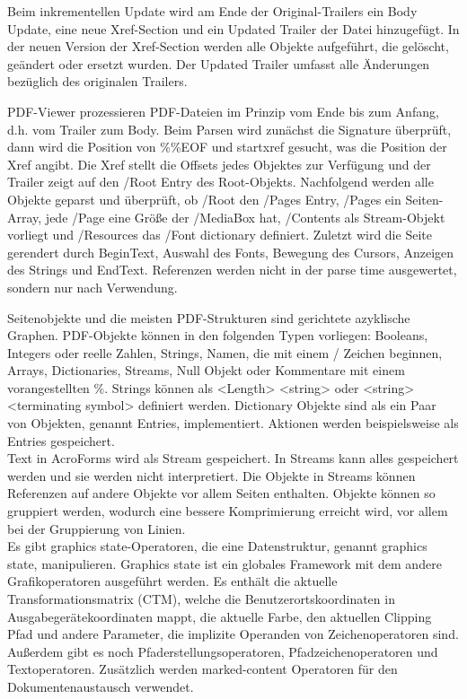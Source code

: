 \par
Beim inkrementellen Update wird am Ende der Original-Trailers ein Body Update, eine neue Xref-Section und ein Updated Trailer der Datei hinzugefügt. In der neuen Version der Xref-Section werden alle Objekte aufgeführt, die gelöscht, geändert oder ersetzt wurden. Der Updated Trailer umfasst alle Änderungen bezüglich des originalen Trailers. \cite{schneeberger}
\par
PDF-Viewer prozessieren PDF-Dateien im Prinzip vom Ende bis zum Anfang, d.h. vom Trailer zum Body. \cite{ccc-break-pdf} Beim Parsen wird zunächst die Signature überprüft, dann wird die Position von \%\%EOF und startxref gesucht, was die Position der Xref angibt. Die Xref stellt die Offsets jedes Objektes zur Verfügung und der Trailer zeigt auf den /Root Entry des Root-Objekts. Nachfolgend werden alle Objekte geparst und überprüft, ob /Root den /Pages Entry, /Pages ein Seiten-Array, jede /Page eine Größe der /MediaBox hat, /Contents als Stream-Objekt vorliegt und /Resources das /Font dictionary definiert. Zuletzt wird die Seite gerendert durch BeginText, Auswahl des Fonts, Bewegung des Cursors, Anzeigen des Strings und EndText. \cite{ccc-pdf-secrets} Referenzen werden nicht in der parse time ausgewertet, sondern nur nach Verwendung. \cite{ccc-wtf-pdf}
\par
Seitenobjekte und die meisten PDF-Strukturen sind gerichtete azyklische Graphen. \cite{ccc-wtf-pdf} PDF-Objekte können in den folgenden Typen vorliegen: Booleans, Integers oder reelle Zahlen, Strings, Namen, die mit einem / Zeichen beginnen, Arrays, Dictionaries, Streams, Null Objekt oder Kommentare mit einem vorangestellten \%. Strings können als <Length> <string> oder <string> <terminating symbol> definiert werden. Dictionary Objekte sind als ein Paar von Objekten, genannt Entries, implementiert. Aktionen werden beispielsweise als Entries gespeichert. \cite{ccc-badpdf} \\
Text in AcroForms wird als Stream gespeichert. In Streams kann alles gespeichert werden und sie werden nicht interpretiert. Die Objekte in Streams können Referenzen auf andere Objekte vor allem Seiten enthalten. \cite{ccc-break-pdf} Objekte können so gruppiert werden, wodurch eine bessere Komprimierung erreicht wird, vor allem bei der Gruppierung von Linien. \cite{schneeberger} \\
Es gibt graphics state-Operatoren, die eine Datenstruktur, genannt graphics state, manipulieren. Graphics state ist ein globales Framework mit dem andere Grafikoperatoren ausgeführt werden. Es enthält die aktuelle Transformationsmatrix (CTM), welche die Benutzerortskoordinaten in Ausgabegerätekoordinaten mappt, die aktuelle Farbe, den aktuellen Clipping Pfad und andere Parameter, die implizite Operanden von Zeichenoperatoren sind. Außerdem gibt es noch Pfaderstellungsoperatoren, Pfadzeichenoperatoren und Textoperatoren. Zusätzlich werden marked-content Operatoren für den Dokumentenaustausch verwendet. \cite{fileformat} 
